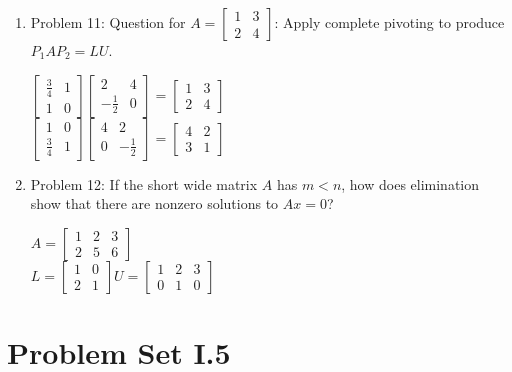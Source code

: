 \documentclass{article}
\renewcommand{\(}{\left(}
\renewcommand{\)}{\right)}
\theoremstyle{plain}
\theoremstyle{plain}
\theoremstyle{definition}
\begin{document}
\begin{enumerate}[label*=\arabic*.,ref=\arabic*]
\item Problem 11: Question for $A = \begin{bmatrix} 1 & 3 \\ 2 & 4\end{bmatrix}$: Apply complete pivoting to produce $P_{1}AP_{2} = LU$.
\begin{shaded}
$\begin{bmatrix} \frac{3}{4} & 1 \\ 1 & 0 \end{bmatrix} \begin{bmatrix} 2 & 4 \\ -\frac{1}{2} & 0 \end{bmatrix} = \begin{bmatrix} 1 & 3 \\ 2 & 4 \end{bmatrix}$ \\

$\begin{bmatrix} 1 & 0 \\ \frac{3}{4} & 1 \end{bmatrix} \begin{bmatrix} 4 & 2 \\ 0 & -\frac{1}{2} \end{bmatrix} = \begin{bmatrix} 4 & 2 \\ 3 & 1 \end{bmatrix}$
\end{shaded}

\item Problem 12: If the short wide matrix $A$ has $m < n$, how does elimination show that there are nonzero solutions to $Ax = 0$?  
\begin{shaded}
$A = \begin{bmatrix} 1 & 2 & 3 \\ 2 & 5 & 6 \end{bmatrix}$ \\

$L = \begin{bmatrix} 1 & 0 \\ 2 & 1 \end{bmatrix} U = \begin{bmatrix} 1 & 2 & 3 \\ 0 & 1 & 0 \end{bmatrix}$
\end{shaded}
\end{enumerate}


\section{Problem Set I.5}
\end{document}
